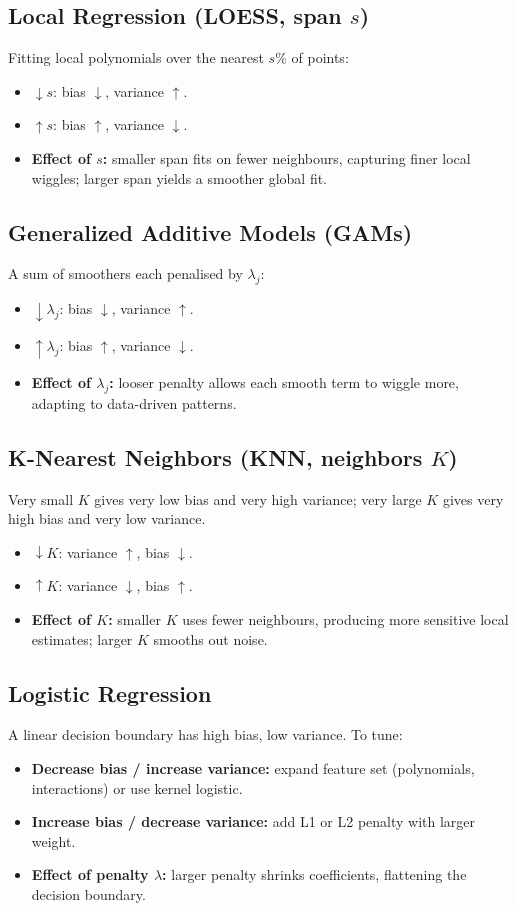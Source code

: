 \documentclass{article}
\begin{document}
\subsection{Local Regression (LOESS, span \(s\))}
Fitting local polynomials over the nearest \(s\%\) of points:
\begin{itemize}
  \item \(\downarrow s\): bias \(\downarrow\), variance \(\uparrow\).
  \item \(\uparrow s\): bias \(\uparrow\), variance \(\downarrow\).
  \item \textbf{Effect of \(s\):} smaller span fits on fewer neighbours, capturing finer local wiggles; larger span yields a smoother global fit.
\end{itemize}

\subsection{Generalized Additive Models (GAMs)}
A sum of smoothers each penalised by \(\lambda_j\):
\begin{itemize}
  \item \(\downarrow\lambda_j\): bias \(\downarrow\), variance \(\uparrow\).
  \item \(\uparrow\lambda_j\): bias \(\uparrow\), variance \(\downarrow\).
  \item \textbf{Effect of \(\lambda_j\):} looser penalty allows each smooth term to wiggle more, adapting to data-driven patterns.
\end{itemize}

\subsection{K-Nearest Neighbors (KNN, neighbors \(K\))}
Very small \(K\) gives very low bias and very high variance; very large \(K\) gives very high bias and very low variance.
\begin{itemize}
  \item \(\downarrow K\): variance \(\uparrow\), bias \(\downarrow\).
  \item \(\uparrow K\): variance \(\downarrow\), bias \(\uparrow\).
  \item \textbf{Effect of \(K\):} smaller \(K\) uses fewer neighbours, producing more sensitive local estimates; larger \(K\) smooths out noise.
\end{itemize}

\subsection{Logistic Regression}
A linear decision boundary has high bias, low variance.  To tune:
\begin{itemize}
  \item \textbf{Decrease bias / increase variance:} expand feature set (polynomials, interactions) or use kernel logistic.
  \item \textbf{Increase bias / decrease variance:} add L1 or L2 penalty with larger weight.
  \item \textbf{Effect of penalty \(\lambda\):} larger penalty shrinks coefficients, flattening the decision boundary.
\end{itemize}
\end{document}
